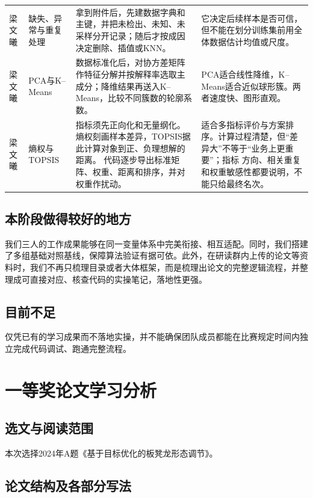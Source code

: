 \documentclass[UTF8,zihao=-4]{ctexart}
\begin{document}
\begin{longtable}{p{1.25cm}p{2.55cm}p{6.25cm}p{5.45cm}}
梁文曦 & 缺失、异常与重复处理
& 拿到附件后，先建数据字典和主键，并把未检出、未知、未采样分开记录；随后才按成因决定删除、插值或KNN。
& 它决定后续样本是否可信，但不能在划分训练集前用全体数据估计均值或尺度。\\

梁文曦 & PCA与K--Means
& 数据标准化后，对协方差矩阵作特征分解并按解释率选取主成分；降维结果再送入K--Means，比较不同簇数的轮廓系数。
& PCA适合线性降维，K--Means适合近似球形簇。两者速度快、图形直观。\\

梁文曦 & 熵权与TOPSIS
& 指标须先正向化和无量纲化。熵权刻画样本差异，TOPSIS据此计算对象到正、负理想解的距离。
代码逐步导出标准矩阵、权重、距离和排序，并对权重作扰动。
& 适合多指标评价与方案排序。计算过程清楚，但“差异大”不等于“业务上更重要”；指标
方向、相关重复和权重敏感性都要说明，不能只给最终名次。\\
\end{longtable}
\normalsize

\subsection{本阶段做得较好的地方}

我们三人的工作成果能够在同一变量体系中完美衔接、相互适配。同时，我们搭建了多组基础对照基线，保障算法验证有据可依。此外，在研读群内上传的论文等资料时，我们不再只梳理目录或者大体框架，而是梳理出论文的完整逻辑流程，并整理成可直接对应、核查代码的实操笔记，落地性更强。

\subsection{目前不足}

仅凭已有的学习成果而不落地实操，并不能确保团队成员都能在比赛规定时间内独立完成代码调试、跑通完整流程。

\section{一等奖论文学习分析}

\subsection{选文与阅读范围}

本次选择2024年A题《基于目标优化的板凳龙形态调节》\cite{A053}。

\subsection{论文结构及各部分写法}
\end{document}
